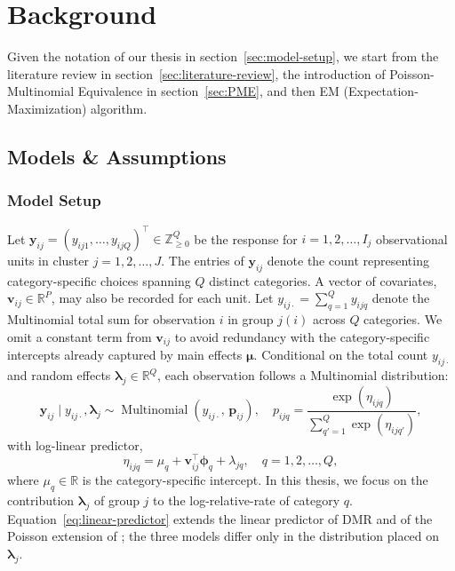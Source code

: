 \chapter{Background}
\label{cha:model-specification}

Given the notation of our thesis in section~\ref{sec:model-setup}, we start from the  literature review in section~\ref{sec:literature-review}, the introduction of Poisson-Multinomial Equivalence in section~\ref{sec:PME}, and then EM (Expectation-Maximization) algorithm.

\section{Models \& Assumptions}
\label{sec:model-setup-assumption}

\subsection{Model Setup}
\label{subsec:model-setup}
Let $\bm{y}_{ij} = (y_{ij1}, \dots, y_{ijQ})^\top \in \mathbb{Z}_{\geq 0}^Q$ be the response for $i=1,2,\dots,I_{j}$ observational units in cluster $j=1,2,\dots ,J$. The entries of $\bm{y}_{ij}$ denote the count representing category-specific choices spanning $Q$ distinct categories. A vector of covariates, $\bm{v}_{ij}\in \mathbb{R}^{P}$, may also be recorded for each unit. Let $y_{ij\cdot}=\sum_{q=1}^{Q}y_{ijq}$ denote the Multinomial total sum for observation $i$ in group $j(i)$ across $Q$ categories. We omit a constant term from $\bm{v}_{ij}$ to avoid redundancy with the category-specific intercepts already captured by main effects $\bm{\mu}$. Conditional on the total count $y_{ij\cdot}$ and random effects $\bm{\lambda}_{j}\in \mathbb{R}^{Q}$, each observation follows a Multinomial distribution:
\begin{equation}
    \bm{y}_{ij} \mid  y_{ij\cdot} , \bm{\lambda}_{j}
    \sim \operatorname{Multinomial}\left(y_{ij\cdot},\, \bm{p}_{ij}\right), \quad p_{ijq}=\frac{\exp(\eta_{ijq})}{\sum_{q'=1}^{Q}\exp(\eta_{ijq'})},
    \label{eq:conditional-pm}
\end{equation}
with log-linear predictor,
\begin{equation}
    \eta_{ijq}=\mu_{q}+\bm{v}_{ij}^{\top}\bm{\phi}_{q}+
    \lambda_{jq}, \quad q=1,2,\dots, Q,
    \label{eq:linear-predictor}
\end{equation}
where $\mu_{q}\in\mathbb{R}$ is the category-specific intercept. In this thesis, we focus on the contribution $\bm{\lambda}_{j}$ of group $j$ to the log-relative-rate of category $q$. Equation~\eqref{eq:linear-predictor} extends the linear predictor of DMR \citep{Taddy2015} and of the Poisson extension of \citet{Lee2017}; the three models differ only in the distribution placed on $\bm{\lambda}_{j}$.

